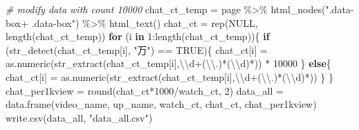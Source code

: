 \documentclass[
]{article}
\newenvironment{Shaded}{\begin{snugshade}}{\end{snugshade}}
\newcommand{\CommentTok}[1]{\textcolor[rgb]{0.56,0.35,0.01}{\textit{#1}}}
\newcommand{\ConstantTok}[1]{\textcolor[rgb]{0.00,0.00,0.00}{#1}}
\newcommand{\ControlFlowTok}[1]{\textcolor[rgb]{0.13,0.29,0.53}{\textbf{#1}}}
\newcommand{\DecValTok}[1]{\textcolor[rgb]{0.00,0.00,0.81}{#1}}
\newcommand{\FunctionTok}[1]{\textcolor[rgb]{0.00,0.00,0.00}{#1}}
\newcommand{\NormalTok}[1]{#1}
\newcommand{\OtherTok}[1]{\textcolor[rgb]{0.56,0.35,0.01}{#1}}
\newcommand{\SpecialCharTok}[1]{\textcolor[rgb]{0.00,0.00,0.00}{#1}}
\newcommand{\StringTok}[1]{\textcolor[rgb]{0.31,0.60,0.02}{#1}}
\begin{document}
\begin{Shaded}
\begin{Highlighting}[]
\CommentTok{\# modify data with count 10000}
\NormalTok{chat\_ct\_temp }\OtherTok{=}\NormalTok{ page }\SpecialCharTok{\%\textgreater{}\%} \FunctionTok{html\_nodes}\NormalTok{(}\StringTok{".data{-}box+ .data{-}box"}\NormalTok{) }\SpecialCharTok{\%\textgreater{}\%} \FunctionTok{html\_text}\NormalTok{()}
\NormalTok{chat\_ct }\OtherTok{=} \FunctionTok{rep}\NormalTok{(}\ConstantTok{NULL}\NormalTok{, }\FunctionTok{length}\NormalTok{(chat\_ct\_temp))}
\ControlFlowTok{for}\NormalTok{ (i }\ControlFlowTok{in} \DecValTok{1}\SpecialCharTok{:}\FunctionTok{length}\NormalTok{(chat\_ct\_temp))\{}
  \ControlFlowTok{if}\NormalTok{ (}\FunctionTok{str\_detect}\NormalTok{(chat\_ct\_temp[i], }\StringTok{"万"}\NormalTok{) }\SpecialCharTok{==} \ConstantTok{TRUE}\NormalTok{)\{}
\NormalTok{    chat\_ct[i] }\OtherTok{=} \FunctionTok{as.numeric}\NormalTok{(}\FunctionTok{str\_extract}\NormalTok{(chat\_ct\_temp[i],}\StringTok{\textquotesingle{}}\SpecialCharTok{\textbackslash{}\textbackslash{}}\StringTok{d+(}\SpecialCharTok{\textbackslash{}\textbackslash{}}\StringTok{.)*(}\SpecialCharTok{\textbackslash{}\textbackslash{}}\StringTok{d)*\textquotesingle{}}\NormalTok{)) }\SpecialCharTok{*} \DecValTok{10000}
\NormalTok{  \}}
  \ControlFlowTok{else}\NormalTok{\{}
\NormalTok{    chat\_ct[i] }\OtherTok{=} \FunctionTok{as.numeric}\NormalTok{(}\FunctionTok{str\_extract}\NormalTok{(chat\_ct\_temp[i],}\StringTok{\textquotesingle{}}\SpecialCharTok{\textbackslash{}\textbackslash{}}\StringTok{d+(}\SpecialCharTok{\textbackslash{}\textbackslash{}}\StringTok{.)*(}\SpecialCharTok{\textbackslash{}\textbackslash{}}\StringTok{d)*\textquotesingle{}}\NormalTok{))}
\NormalTok{  \}}
\NormalTok{\}}
\NormalTok{chat\_per1kview }\OtherTok{=} \FunctionTok{round}\NormalTok{(chat\_ct}\SpecialCharTok{*}\DecValTok{1000}\SpecialCharTok{/}\NormalTok{watch\_ct, }\DecValTok{2}\NormalTok{)}
\NormalTok{data\_all }\OtherTok{=} \FunctionTok{data.frame}\NormalTok{(video\_name, up\_name, watch\_ct, chat\_ct, chat\_per1kview)}
\FunctionTok{write.csv}\NormalTok{(data\_all, }\StringTok{"data\_all.csv"}\NormalTok{)}
\end{Highlighting}
\end{Shaded}
\end{document}
